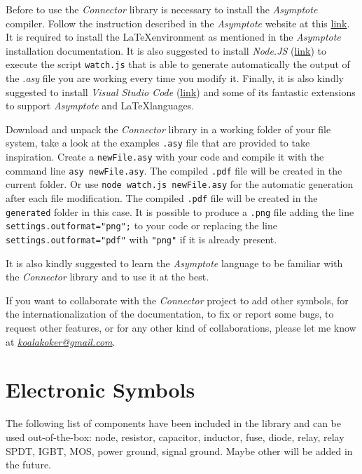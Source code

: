 \documentclass[a4paper,12pt]{report}
\begin{document}
Before to use the \emph{Connector} library is necessary to install the \emph{Asymptote } compiler. Follow the instruction described in the \emph{Asymptote} website at this \href{https://asymptote.sourceforge.io}{link}. It is required to install the \LaTeX environment as mentioned in the \emph{Asymptote} installation documentation. It is also suggested to install \emph{Node.JS} (\href{https://nodejs.org}{link}) to execute the script \texttt{watch.js} that is able to generate automatically the output of the \emph{.asy} file you are working every time you modify it. Finally, it is also kindly suggested to install \emph{Visual Studio Code} (\href{https://code.visualstudio.com}{link}) and some of its fantastic extensions to support \emph{Asymptote} and \LaTeX languages.

Download and unpack the \emph{Connector} library in a working folder of your file system, take a look at the examples \texttt{.asy} file that are provided to take inspiration. Create a \texttt{newFile.asy} with your code and compile it with the command line \texttt{asy newFile.asy}. The compiled \texttt{.pdf} file will be created in the current folder. Or use \texttt{node watch.js newFile.asy} for the automatic generation after each file modification. The compiled \texttt{.pdf} file will be created in the \texttt{generated} folder in this case. It is possible to produce a \texttt{.png} file adding the line \texttt{settings.outformat="png";} to your code or replacing the line \texttt{settings.outformat="pdf"} with \texttt{"png"} if it is already present.

It is also kindly suggested to learn the \emph{Asymptote} language to be familiar with the \emph{Connector} library and to use it at the best.

If you want to collaborate with the \emph{Connector} project to add other symbols, for the internationalization of the documentation, to fix or report some bugs, to request other features, or for any other kind of collaborations, please let me know at \emph{\href{mailto:koalakoker@gmail.com}{koalakoker@gmail.com}}.

\section*{Electronic Symbols}

The following list of components have been included in the library and can be used out-of-the-box: node, resistor, capacitor, inductor, fuse, diode, relay, relay SPDT, IGBT, MOS, power ground, signal ground. Maybe other will be added in the future.
\end{document}
